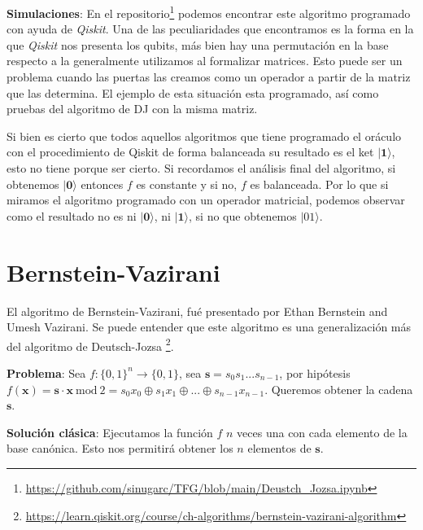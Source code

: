 \textbf{Simulaciones}: En el repositorio\footnote{\url{https://github.com/sinugarc/TFG/blob/main/Deustch_Jozsa.ipynb}} podemos encontrar este algoritmo programado con ayuda de \textit{Qiskit}. Una de las peculiaridades que encontramos es la forma en la que \textit{Qiskit} nos presenta los qubits, más bien hay una permutación en la base respecto a la generalmente utilizamos al formalizar matrices. Esto puede ser un problema cuando las puertas las creamos como un operador a partir de la matriz que las determina. El ejemplo de esta situación esta programado, así como pruebas del algoritmo de DJ con la misma matriz. \newline

Si bien es cierto que todos aquellos algoritmos que tiene programado el oráculo con el procedimiento de Qiskit de forma balanceada su resultado es el ket $|\mathbf{1}\rangle$, esto no tiene porque ser cierto. Si recordamos el análisis final del algoritmo, si obtenemos $|\textbf{0}\rangle$ entonces $f$ es constante y si no, $f$ es balanceada. Por lo que si miramos el algoritmo programado con un operador matricial, podemos observar como el resultado no es ni $|\textbf{0}\rangle$, ni $|\textbf{1}\rangle$, si no que obtenemos $|01\rangle$.


\section{Bernstein-Vazirani}
\label{Sec3.4:BV}

El algoritmo de Bernstein-Vazirani, fué presentado por Ethan Bernstein and Umesh Vazirani\cite{AR:BV:1997}. Se puede entender que este algoritmo es una generalización más del algoritmo de Deutsch-Jozsa \footnote{\url{https://learn.qiskit.org/course/ch-algorithms/bernstein-vazirani-algorithm}}. 

\vspace{5pt}

\textbf{Problema}: Sea $f:\{0,1\}^{n} \rightarrow \{0,1\}$, sea $\mathbf{s}=s_{0}s_{1}...s_{n-1}$, por hipótesis $f(\mathbf{x})=\mathbf{s}\cdot \mathbf{x}\: \text{mod}\:2 = s_{0}x_{0} \oplus s_{1}x_{1} \oplus ... \oplus s_{n-1}x_{n-1}$. Queremos obtener la cadena $\mathbf{s}$.

\vspace{5pt}

\textbf{Solución clásica}: Ejecutamos la función $f$ $n$ veces una con cada elemento de la base canónica. Esto nos permitirá obtener los $n$ elementos de $\mathbf{s}$.\newline

